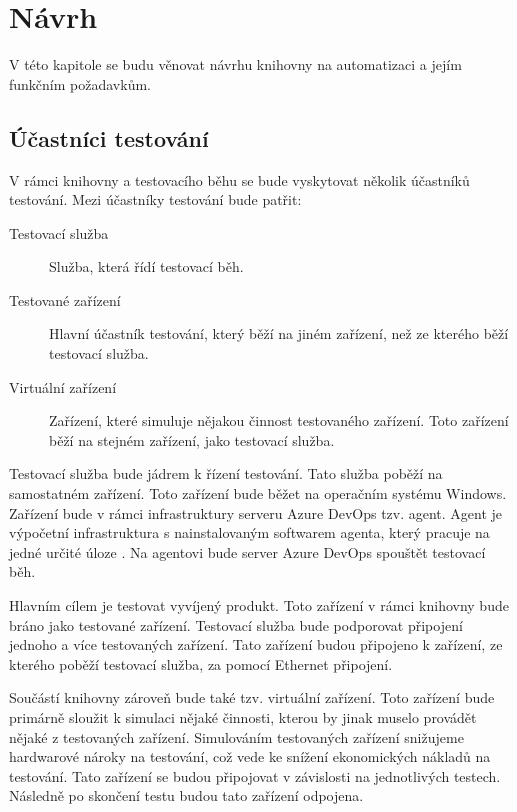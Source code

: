 \chapter{Návrh}

V této kapitole se budu věnovat návrhu knihovny na automatizaci a jejím funkčním požadavkům.

\section{Účastníci testování}
V rámci knihovny a testovacího běhu se bude vyskytovat několik účastníků testování. Mezi účastníky testování bude patřit:

\begin{description}
    \item[Testovací služba] Služba, která řídí testovací běh.
    \item[Testované zařízení] Hlavní účastník testování, který běží na jiném zařízení, než ze kterého běží testovací služba. 
    \item[Virtuální zařízení] Zařízení, které simuluje nějakou činnost testovaného zařízení. Toto zařízení běží na stejném zařízení, jako testovací služba. 
\end{description}

Testovací služba bude jádrem k řízení testování. Tato služba poběží na samostatném zařízení. Toto zařízení bude běžet na operačním systému Windows. Zařízení bude v rámci infrastruktury serveru Azure DevOps tzv. agent. Agent je výpočetní infrastruktura s nainstalovaným softwarem agenta, který pracuje na jedné určité úloze \cite{agent_docs}. Na agentovi bude server Azure DevOps spouštět testovací běh.

Hlavním cílem je testovat vyvíjený produkt. Toto zařízení v rámci knihovny bude bráno jako testované zařízení. Testovací služba bude podporovat připojení jednoho a více testovaných zařízení. Tato zařízení budou připojeno k zařízení, ze kterého poběží testovací služba, za pomocí Ethernet připojení. 

Součástí knihovny zároveň bude také tzv. virtuální zařízení. Toto zařízení bude primárně sloužit k simulaci nějaké činnosti, kterou by jinak muselo provádět nějaké z testovaných zařízení. Simulováním testovaných zařízení snižujeme hardwarové nároky na testování, což vede ke snížení ekonomických nákladů na testování. Tato zařízení se budou připojovat v závislosti na jednotlivých testech. Následně po skončení testu budou tato zařízení odpojena.

